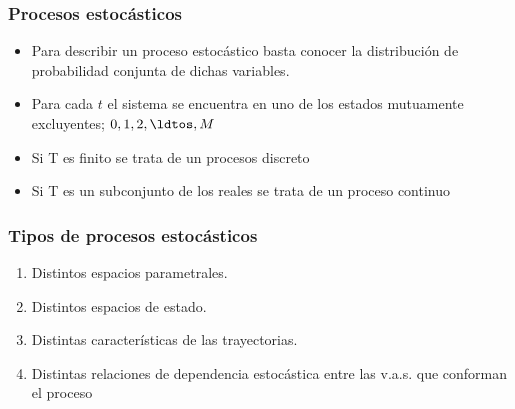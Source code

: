 \documentclass[spanish]{beamer}
\begin{document}
\begin{frame}
\frametitle{Procesos estocásticos}
\begin{itemize}
\item Para describir un proceso estocástico basta conocer la distribución de probabilidad conjunta de dichas variables.
\item Para cada $t$ el sistema se encuentra en uno de los estados mutuamente excluyentes; $0,1,2, \ldtos, M$
\item Si T es finito se trata de un procesos discreto 
\item Si T es un subconjunto de los reales se trata de un proceso continuo
\end{itemize}

\end{frame}
\begin{frame}
\frametitle{Tipos de procesos estocásticos}
\begin{enumerate}
\item Distintos espacios parametrales.
\item Distintos espacios de estado.
\item Distintas características de las trayectorias. 
\item Distintas relaciones de dependencia estocástica entre las v.a.s. que conforman el proceso
\end{enumerate}
\end{frame}

\end{document}
